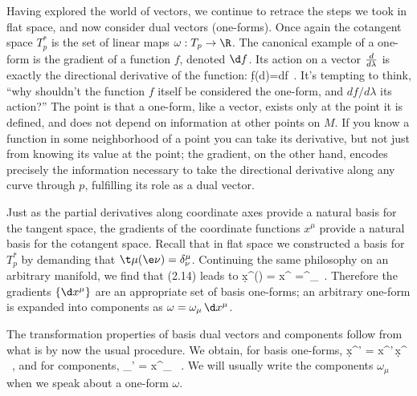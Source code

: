 \documentclass[12pt]{article}
\begin{document}
Having explored the world of vectors, we continue to retrace the steps
we took in flat space, and now consider dual vectors (one-forms).
Once again the cotangent space $T^*_p$ is the set of linear maps
$\omega:T_p\rightarrow\R$.  The canonical example of a one-form is
the gradient of a function $f$, denoted $\d f$.  Its action on a
vector ${d\over{d\lambda}}$ is exactly the directional derivative of
the function:
\be
  \d f\left({d}\right)={{df}}\ .\label{2.14}
\ee
It's tempting to think, ``why shouldn't the function $f$ itself be 
considered the one-form, and $df/d\lambda$ its action?''  The point
is that a one-form, like a vector, exists only at the point it
is defined, and does not depend on information at other points on $M$.
If you know a function in some neighborhood of a point you can take
its derivative, but not just from knowing its value at the point;
the gradient, on the other hand, encodes precisely the
information necessary to take the directional derivative along any curve
through $p$, fulfilling its role as a dual vector.

Just as the partial derivatives along coordinate axes provide a natural
basis for the tangent space, the gradients of the coordinate functions
$x^\mu$ provide a natural basis for the cotangent space.  Recall that in
flat space we constructed a basis for $T^*_p$ by demanding that
$\t\mu(\e\nu)=\delta^\mu_\nu$.  Continuing the same philosophy on an
arbitrary manifold, we find that (2.14) leads to
\be
  \d x^\mu(\p\nu) = {{\partial x^\mu}} 
  =\delta^\mu_\nu\ .\label{2.15}
\ee
Therefore the gradients $\{\d x^\mu\}$ are an appropriate set of
basis one-forms; an arbitrary one-form is expanded into components
as $\omega = \omega_\mu\,\d x^\mu$.

The transformation properties of basis dual vectors and components
follow from what is by now the usual procedure.  We obtain, for
basis one-forms,
\be
  \d x^{\mu'} = {{\partial x^{\mu'}}}\,\d x^\mu
  \  ,\label{2.16}
\ee
and for components,
\be
  \omega_{\mu'} = {{\partial x^{\mu}}}\omega_\mu
  \ .\label{2.17}
\ee
We will usually write the components $\omega_\mu$ when we speak about a
one-form $\omega$.
\end{document}
